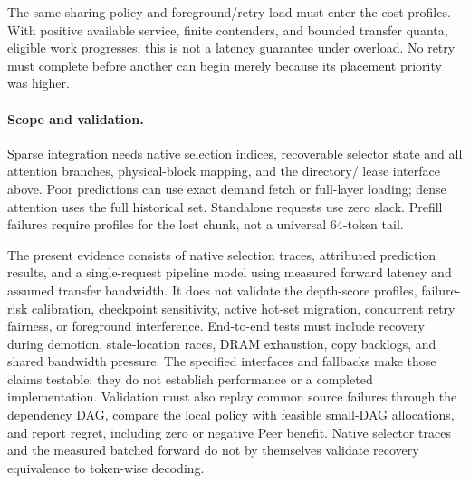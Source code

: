 The same sharing policy and foreground/retry load must enter the cost
profiles. With positive available service, finite contenders, and bounded
transfer quanta, eligible work progresses; this is not a latency guarantee
under overload. No retry must complete before another can begin merely
because its placement priority was higher.

\paragraph{Scope and validation.}
\label{sec:design-discussion}
Sparse integration needs native selection indices, recoverable selector
state and all attention branches, physical-block mapping, and the directory/
lease interface above. Poor predictions can use exact demand fetch or
full-layer loading; dense attention uses the full historical set.
Standalone requests use zero slack. Prefill failures require profiles for
the lost chunk, not a universal 64-token tail.

The present evidence consists of native selection traces, attributed
prediction results, and a single-request pipeline model using measured
forward latency and assumed transfer bandwidth. It does
not validate the depth-score profiles, failure-risk calibration, checkpoint
sensitivity, active hot-set migration, concurrent retry fairness, or
foreground interference. End-to-end tests must include recovery during
demotion, stale-location races, DRAM exhaustion, copy backlogs, and shared
bandwidth pressure. The specified interfaces and fallbacks make those
claims testable; they do not establish performance or a completed implementation.
Validation must also replay common source failures through the dependency
DAG, compare the local policy with feasible small-DAG allocations, and
report regret, including zero or negative Peer benefit. Native selector
traces and the measured batched forward do not by themselves validate
recovery equivalence to token-wise decoding.
